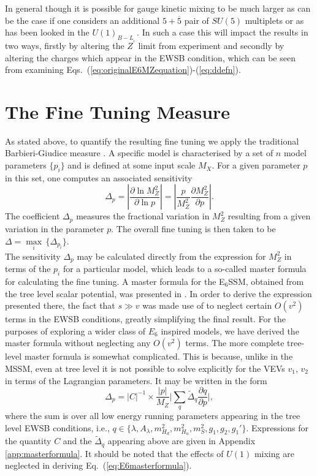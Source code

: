 \documentclass[preprint,amsmath,amssymb,aps,superscriptaddress,prd,
showpacs,floatfix,nofootinbib]{revtex4-1}
\newcommand{\be}{\begin{equation}}
\newcommand{\ee}{\end{equation}}
\begin{document}
In general though it is possible for gauge kinetic mixing to be much larger
as can be the case if one considers an additional $5 + \overline{5}$ pair of
$SU(5)$ multiplets \cite{Rizzo:1998ut} or as has been looked in the $U(1)_{B-L}$
\cite{Salvioni:2009mt,Krauss:2012ku}.  In such a case this will impact the
results in two ways, firstly by altering the $Z^\prime$ limit from experiment
and secondly by altering the charges which appear in the EWSB condition,
which can be seen from examining
Eqs.~(\ref{eq:originalE6MZequation})-(\ref{eq:ddefn}).

\section{\label{sec:tuningmeasure}The Fine Tuning
Measure}

As stated above, to quantify the resulting fine tuning we apply the
traditional Barbieri-Giudice measure \cite{Ellis:1986yg, Barbieri:1987fn}.
A specific model is characterised by a set of $n$ model parameters $\{p_i\}$
and is defined at some input scale $M_X$. For a given parameter $p$ in this
set, one computes an associated sensitivity
\begin{equation} \label{eq:bgmeasure}
\Delta_p = \left | \frac{\partial \ln M_Z^2}{\partial \ln p} \right
| = \left | \frac{p}{M_Z^2} \frac{\partial M_Z^2}{\partial p} \right | .
\end{equation}
The coefficient $\Delta_p$ measures the fractional variation in $M_Z^2$
resulting from a given variation in the parameter $p$.  The overall fine
tuning is then taken to be
$\Delta = \underset{i}{\max} \, \{ \Delta_{p_i} \}$.\\

The sensitivity $\Delta_p$ may be calculated directly from the expression
for $M_Z^2$ in terms of the $p_i$ for a particular model, which leads to a
so-called master formula for calculating the fine tuning.  A master formula
for the E$_6$SSM, obtained from the tree level scalar potential, was
presented in \cite{Athron:2013ipa}.  In order to derive the expression
presented there, the fact that $s \gg v$ was made use of to neglect certain
$O(v^2)$ terms in the EWSB conditions, greatly simplifying the final result.
For the purposes of exploring a wider class of $E_6$ inspired models, we have
derived the master formula without neglecting any $O(v^2)$ terms.  The more
complete tree-level master formula is somewhat complicated.  This is
because, unlike in the MSSM, even at tree level it is not possible to
solve explicitly for the VEVs $v_1$, $v_2$ in terms of the Lagrangian
parameters.  It may be written in the form \be \Delta_p = |C|^{-1} \times
\frac{|p|}{M_Z} \bigg | \sum_{q} \tilde{\Delta}_q \frac{\partial q}
{\partial p} \bigg | , \label{eq:E6masterformula}
\ee where the sum is over all low energy running parameters appearing
in the tree level EWSB conditions, i.e., $q \in \{\lambda , A_\lambda ,
m_{H_d}^2 , m_{H_u}^2 , m_S^2 , g_1 , g_2 , g_1'\}$.  Expressions for the
quantity $C$ and the $\tilde{\Delta}_q$ appearing above are given in
Appendix \ref{app:masterformula}.  It should be noted that the effects
of $U(1)$ mixing are neglected in deriving Eq.~(\ref{eq:E6masterformula}).
\end{document}
